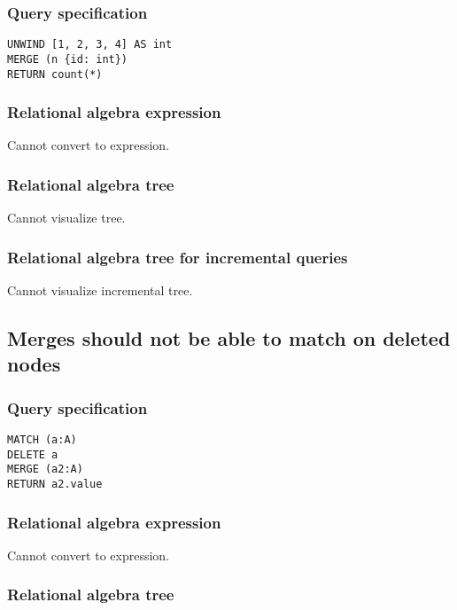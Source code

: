 \subsubsection*{Query specification}

\begin{lstlisting}
UNWIND [1, 2, 3, 4] AS int
MERGE (n {id: int})
RETURN count(*)
\end{lstlisting}

\subsubsection*{Relational algebra expression}

Cannot convert to expression.

\subsubsection*{Relational algebra tree}

Cannot visualize tree.

\subsubsection*{Relational algebra tree for incremental queries}

Cannot visualize incremental tree.

\subsection{Merges should not be able to match on deleted nodes}

\subsubsection*{Query specification}

\begin{lstlisting}
MATCH (a:A)
DELETE a
MERGE (a2:A)
RETURN a2.value
\end{lstlisting}

\subsubsection*{Relational algebra expression}

Cannot convert to expression.

\subsubsection*{Relational algebra tree}

